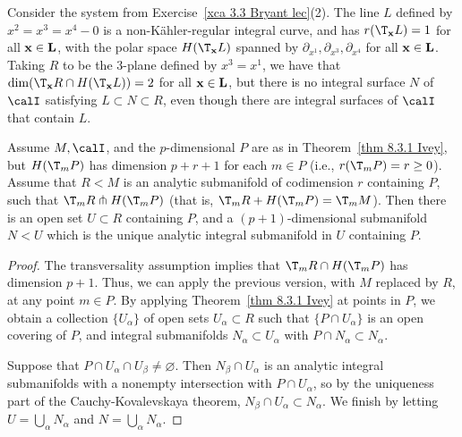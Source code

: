 \begin{example}
    Consider the system from Exercise~\ref{xca 3.3 Bryant lec}(2). The line $L$ defined by $x^2=x^3=x^4-0$ is a non-K\"ahler-regular integral curve, and has $r(\T_{\bf{x}}L)=1$ for all $\bf{x}\in L$, with the polar space $H(\T_{\bf{x}}L)$ spanned by $\partial_{x^1},\partial_{x^3},\partial_{x^4}$ for all $\bf{x}\in L$. Taking $R$ to be the $3$-plane defined by $x^3=x^1$, we have that $\dim(\T_{\bf{x}}R\cap H(\T_{\bf{x}}L))=2$ for all $\bf{x}\in L$, but there is no integral surface $N$ of $\calI$ satisfying $L\subset N\subset R$, even though there are integral surfaces of $\calI$ that contain $L$. 
\end{example}


\begin{thm}\label{thm 8.3.2 Ivey}
    Assume $M,\calI$, and the $p$-dimensional $P$ are as in Theorem~\ref{thm 8.3.1 Ivey}, but $H(\T_m P)$ has dimension $p+r+1$ for each $m\in P$ (i.e., $r(\T_m P)=r\geq 0$). Assume that $R<M$ is an analytic submanifold of codimension $r$ containing $P$, such that $\T_m R\pitchfork H(\T_m P)$ (that is, $\T_m R+ H(\T_m P)=\T_m M$). Then there is an open set $U\subset R$ containing $P$, and a $(p+1)$-dimensional submanifold $N<U$ which is the unique analytic integral submanifold in $U$ containing $P$.
\end{thm}
\begin{proof}
    The transversality assumption implies that $\T_m R\cap H(\T_m P)$ has dimension $p+1$. Thus, we can apply the previous version, with $M$ replaced by $R$, at any point $m\in P$. By applying Theorem~\ref{thm 8.3.1 Ivey} at points in $P$, we obtain a collection $\{U_\alpha\}$ of open sets $U_\alpha\subset R$ such that $\{P\cap U_\alpha\}$ is an open covering of $P$, and integral submanifolds $N_\alpha\subset U_\alpha$ with $P\cap N_\alpha\subset N_\alpha$.

    Suppose that $P\cap U_\alpha\cap U_\beta\neq \varnothing$. Then $N_\beta\cap U_\alpha$ is an analytic integral submanifolds with a nonempty intersection with $P\cap U_\alpha$, so by the uniqueness part of the Cauchy-Kovalevskaya theorem, $N_\beta\cap U_\alpha\subset N_\alpha$. We finish by letting $U=\bigcup_\alpha N_\alpha$ and $N=\bigcup_\alpha N_\alpha$.
\end{proof}


